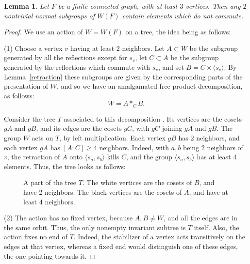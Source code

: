 \documentclass[11pt,a4paper]{article}
\newtheorem{lem}[thm]{Lemma}
\begin{document}
\begin{lem}\label{centralizer}
Let $F$ be a finite connected graph, with at least $3$ vertices. Then any $2$ nontrivial normal subgroups of $W(F)$ contain elements which do not commute.
\end{lem}

\begin{proof}
We use an action of $W=W(F)$ on a tree, the idea being as follows:

(1) Choose a vertex $v$ having at least 2 neighbors. Let $A\subset W$ be the subgroup generated by all the reflections except for $s_v$, let $C\subset A$ be the subgroup generated by the reflections which commute with $s_v$, and set $B=C\times\langle s_v\rangle$. By Lemma~\ref{retraction} these subgroups are given by the corresponding parts of the presentation of $W$, and so we have an amalgamated free product decomposition, as follows:
\[
 W=A*_CB.
\]

Consider the tree $T$ associated to this decomposition \cite{trees}. Its vertices are the cosets $gA$ and $gB$, and its edges are the cosets $gC$, with $gC$ joining $gA$ and $gB$. The group $W$ acts on $T$, by left multiplication. Each vertex $gB$ has 2 neighbors, and each vertex $gA$ has $[A:C]\geq4$ neighbors. Indeed, with $a,b$ being 2 neighbors of $v$, the retraction of $A$ onto $\langle s_a,s_b\rangle$ kills $C$, and the group $\langle s_a,s_b\rangle$ has at least 4 elements. Thus, the tree looks as follows:

\begin{figure}[H]\centering
{}
\caption{A part of the tree $T$. The white vertices are the cosets of $B$, and have 2 neighbors. The black vertices are the cosets of $A$, and have at least 4 neighbors.}
\end{figure}

(2) The action has no fixed vertex, because $A,B\neq W$, and all the edges are in the same orbit. Thus, the only nonempty invariant subtree is $T$ itself. Also, the action fixes no end of $T$. Indeed, the stabilizer of a vertex acts transitively on the edges at that vertex, whereas a fixed end would distinguish one of these edges, the one pointing towards it.


\end{proof}
\end{document}
